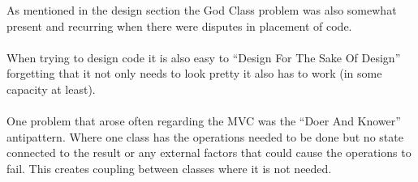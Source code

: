 \documentclass[main.tex]{subfiles}
\begin{document}
As mentioned in the design section the God Class problem was also somewhat present and recurring when there were disputes in placement of code.
\\ \\
When trying to design code it is also easy to “Design For The Sake Of Design” forgetting that it not only needs to look pretty it also has to work (in some capacity at least).
\\ \\
One problem that arose often regarding the MVC was the “Doer And Knower” antipattern. Where one class has the operations needed to be done but no state connected to the result or any external factors that could cause the operations to fail. This creates coupling between classes where it is not needed.
\end{document}
